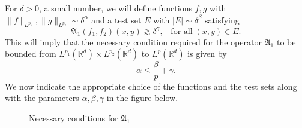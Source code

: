 \documentclass[a4paper,reqno]{amsart}
\theoremstyle{definition}
\theoremstyle{remark}
\numberwithin{equation}{section}
\newcommand{\R}{{\mathbb {R}}}
\begin{document}
	For $\delta>0$, a small number, we will define functions $f, g$ with $\|f\|_{L^{p_1}},\|g\|_{L^{p_2}}\sim\delta^\alpha$ and a test set $E$ with $|E|\sim\delta^\beta$ satisfying 
	\[\mathfrak{A}_1(f_1,f_2)(x,y)\gtrsim \delta^\gamma, \;\;\;\text{for all}\;(x,y)\in E.\]
	This will imply that the necessary condition required for the operator $\mathfrak{A}_1$ to be bounded from $L^{p_1}(\R^d)\times L^{p_2}(\R^d)$ to $L^p(\R^d)$	is given by
	\[\alpha \leq \frac{\beta}{p}+\gamma.\]
	We now indicate the appropriate choice of the functions and the test sets along with the parameters $\alpha, \beta, \gamma$ in the figure below.
	\begin{figure}[H]
		\centering
		\caption{Necessary conditions for $\mathfrak{A}_1$}
		\label{fig:necessary-conditions}
	\end{figure}
\end{document}
